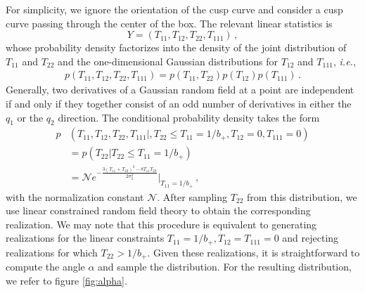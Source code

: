 \documentclass[a4paper, 11pt]{article}
\begin{document}
\bigskip
For simplicity, we ignore the orientation of the cusp curve and consider a cusp curve passing through the center of the box. The relevant linear statistics is
\begin{equation}
Y=(T_{11},T_{12},T_{22},T_{111})\,,
\end{equation}
whose probability density factorizes into the density of the joint distribution of $T_{11}$ and $T_{22}$ and the one-dimensional Gaussian distributions for $T_{12}$ and $T_{111}$, \textit{i.e.},
\begin{align}
p(T_{11},T_{12},T_{22},T_{111}) = p(T_{11},T_{22})p(T_{12})p(T_{111})\,.
\end{align}
Generally, two derivatives of a Gaussian random field at a point are independent if and only if they together consist of an odd number of derivatives in either the $q_1$ or the $q_2$ direction. The conditional probability density takes the form
\begin{align}
p&(T_{11},T_{12},T_{22},T_{111}|,T_{22}\leq T_{11}=1/b_+,T_{12}=0,T_{111}=0) \nonumber\\
&= p(T_{22}| T_{22} \leq T_{11}=1/b_+)\nonumber\\
&= \mathcal{N} e^{-\frac{3(T_{11} + T_{22})^2 - 8 T_{11} T_{22}}{2 \sigma_2^2}}\big|_{T_{11}=1/b_+}\,,
\end{align}
with the normalization constant $\mathcal{N}$. After sampling $T_{22}$ from this distribution, we use linear constrained random field theory to obtain the corresponding realization. We may note that this procedure is equivalent to generating realizations for the linear constraints $T_{11}=1/b_+,T_{12}=T_{111}=0$ and rejecting realizations for which $T_{22} > 1/b_+$. Given these realizations, it is straightforward to compute the angle $\alpha$ and sample the distribution. For the resulting distribution, we refer to figure \ref{fig:alpha}.
\end{document}
